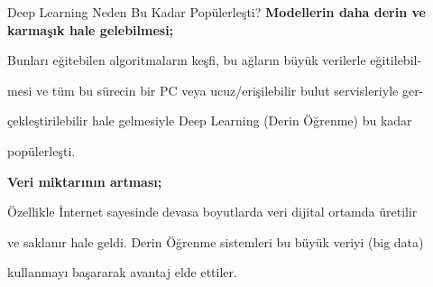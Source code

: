 \documentclass{beamer}                                                                                          %
\begin{document}
    \begin{frame}{Deep Learning Neden Bu Kadar Popülerleşti?}
	    \justifying
	    \color{myred1}\textbf{Modellerin daha derin ve karmaşık hale gelebilmesi;}\color{black}\par \vspace{2} \hspace{10}Bunları eğitebilen algoritmaların keşfi, bu ağların büyük verilerle eğitilebil-\par \vspace{2} \hspace{10}mesi ve tüm bu sürecin bir PC veya ucuz/erişilebilir bulut servisleriyle ger-\par \vspace{2} \hspace{10}çekleştirilebilir hale gelmesiyle Deep Learning (Derin Öğrenme) bu kadar \par \vspace{2} \hspace{10}popülerleşti.\par \vspace{25}
	    \color{myred1}\textbf{Veri miktarının artması;}\color{black}\par \vspace{2} \hspace{10}Özellikle İnternet sayesinde devasa boyutlarda veri dijital ortamda üretilir \par \vspace{2} \hspace{10}ve saklanır hale geldi. Derin Öğrenme sistemleri bu büyük veriyi (big data) \par \vspace{2} \hspace{10}kullanmayı başararak avantaj elde ettiler.
    \end{frame}
    
	
\end{document}
